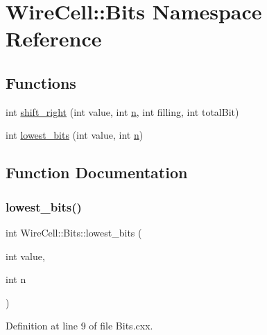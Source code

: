 \hypertarget{namespace_wire_cell_1_1_bits}{}\section{Wire\+Cell\+:\+:Bits Namespace Reference}
\label{namespace_wire_cell_1_1_bits}
\subsection*{Functions}
\begin{DoxyCompactItemize}
\item 
int \hyperlink{namespace_wire_cell_1_1_bits_a8f37a8aac0ef77057acbc6591d9b6d0d}{shift\+\_\+right} (int value, int \hyperlink{format_8h_a9ab7e5832cef391eb8b1505a601fb215}{n}, int filling, int total\+Bit)
\item 
int \hyperlink{namespace_wire_cell_1_1_bits_a1b2ad075bcc60492e9d6c97d3dc302c0}{lowest\+\_\+bits} (int value, int \hyperlink{format_8h_a9ab7e5832cef391eb8b1505a601fb215}{n})
\end{DoxyCompactItemize}


\subsection{Function Documentation}
\mbox{\label{namespace_wire_cell_1_1_bits_a1b2ad075bcc60492e9d6c97d3dc302c0}} 
\subsubsection{\texorpdfstring{lowest\+\_\+bits()}{lowest\_bits()}}
{\footnotesize\ttfamily int Wire\+Cell\+::\+Bits\+::lowest\+\_\+bits (\begin{DoxyParamCaption}\item[{int}]{value,  }\item[{int}]{n }\end{DoxyParamCaption})}



Definition at line 9 of file Bits.\+cxx.

\mbox{\label{namespace_wire_cell_1_1_bits_a8f37a8aac0ef77057acbc6591d9b6d0d}} 
